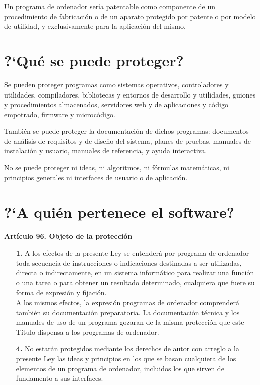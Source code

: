 Un programa de ordenador sería patentable como componente de un procedimiento de fabricación o de un aparato protegido por patente o por modelo de utilidad, y exclusivamente para la aplicación del mismo.

\section{?`Qué se puede proteger?}

Se pueden proteger programas como sistemas operativos, controladores y utilidades, compiladores, bibliotecas y entornos de desarrollo y utilidades, guiones y procedimientos almacenados, servidores web y de aplicaciones y código empotrado, firmware y microcódigo.

También se puede proteger la documentación de dichos programas: documentos de análisis de requisitos y de diseño del sistema, planes de pruebas, manuales de instalación y usuario, manuales de referencia, y ayuda interactiva.

No se puede proteger ni ideas, ni algoritmos, ni fórmulas matemáticas, ni principios generales ni interfaces de usuario o de aplicación.

\section{?`A quién pertenece el software?}

\textbf{Artículo 96. Objeto de la protección}

\begin{itemize}
    \item[\textbf{1.}] A los efectos de la presente Ley se entenderá por programa de ordenador toda secuencia de instrucciones o indicaciones destinadas a ser utilizadas, directa o indirectamente, en un sistema informático para realizar una función o una tarea o para obtener un resultado determinado, cualquiera que fuere su forma de expresión y fijación.\\
        A los mismos efectos, la expresión programas de ordenador comprenderá también su documentación preparatoria. La documentación técnica y los manuales de uso de un programa gozaran de la misma protección que este Título dispensa a los programas de ordenador.

    \item[\textbf{4.}] No estarán protegidos mediante los derechos de autor con arreglo a la presente Ley las ideas y principios en los que se basan cualquiera de los elementos de un programa de ordenador, incluidos los que sirven de fundamento a sus interfaces.

\end{itemize}

